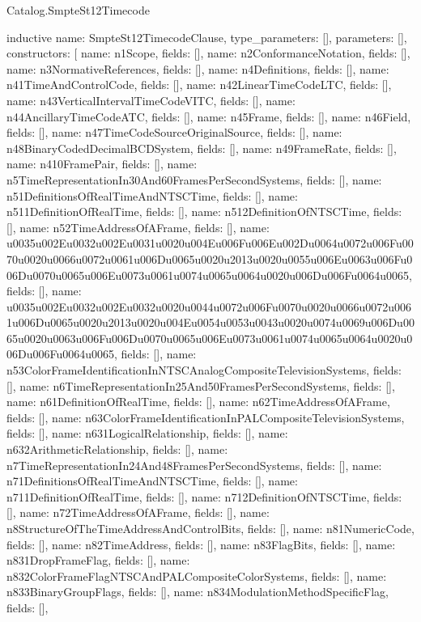 \begin{lexlean}{Catalog.SmpteSt12Timecode}
\begin{semanticmodule}
inductive{
  name: SmpteSt12TimecodeClause,
  type_parameters: [],
  parameters: [],
  constructors: [
    {name: n1Scope, fields: []},
    {name: n2ConformanceNotation, fields: []},
    {name: n3NormativeReferences, fields: []},
    {name: n4Definitions, fields: []},
    {name: n41TimeAndControlCode, fields: []},
    {name: n42LinearTimeCodeLTC, fields: []},
    {name: n43VerticalIntervalTimeCodeVITC, fields: []},
    {name: n44AncillaryTimeCodeATC, fields: []},
    {name: n45Frame, fields: []},
    {name: n46Field, fields: []},
    {name: n47TimeCodeSourceOriginalSource, fields: []},
    {name: n48BinaryCodedDecimalBCDSystem, fields: []},
    {name: n49FrameRate, fields: []},
    {name: n410FramePair, fields: []},
    {name: n5TimeRepresentationIn30And60FramesPerSecondSystems, fields: []},
    {name: n51DefinitionsOfRealTimeAndNTSCTime, fields: []},
    {name: n511DefinitionOfRealTime, fields: []},
    {name: n512DefinitionOfNTSCTime, fields: []},
    {name: n52TimeAddressOfAFrame, fields: []},
    {name: u0035u002Eu0032u002Eu0031u0020u004Eu006Fu006Eu002Du0064u0072u006Fu0070u0020u0066u0072u0061u006Du0065u0020u2013u0020u0055u006Eu0063u006Fu006Du0070u0065u006Eu0073u0061u0074u0065u0064u0020u006Du006Fu0064u0065, fields: []},
    {name: u0035u002Eu0032u002Eu0032u0020u0044u0072u006Fu0070u0020u0066u0072u0061u006Du0065u0020u2013u0020u004Eu0054u0053u0043u0020u0074u0069u006Du0065u0020u0063u006Fu006Du0070u0065u006Eu0073u0061u0074u0065u0064u0020u006Du006Fu0064u0065, fields: []},
    {name: n53ColorFrameIdentificationInNTSCAnalogCompositeTelevisionSystems, fields: []},
    {name: n6TimeRepresentationIn25And50FramesPerSecondSystems, fields: []},
    {name: n61DefinitionOfRealTime, fields: []},
    {name: n62TimeAddressOfAFrame, fields: []},
    {name: n63ColorFrameIdentificationInPALCompositeTelevisionSystems, fields: []},
    {name: n631LogicalRelationship, fields: []},
    {name: n632ArithmeticRelationship, fields: []},
    {name: n7TimeRepresentationIn24And48FramesPerSecondSystems, fields: []},
    {name: n71DefinitionsOfRealTimeAndNTSCTime, fields: []},
    {name: n711DefinitionOfRealTime, fields: []},
    {name: n712DefinitionOfNTSCTime, fields: []},
    {name: n72TimeAddressOfAFrame, fields: []},
    {name: n8StructureOfTheTimeAddressAndControlBits, fields: []},
    {name: n81NumericCode, fields: []},
    {name: n82TimeAddress, fields: []},
    {name: n83FlagBits, fields: []},
    {name: n831DropFrameFlag, fields: []},
    {name: n832ColorFrameFlagNTSCAndPALCompositeColorSystems, fields: []},
    {name: n833BinaryGroupFlags, fields: []},
    {name: n834ModulationMethodSpecificFlag, fields: []},
}
\end{semanticmodule}
\end{lexlean}
